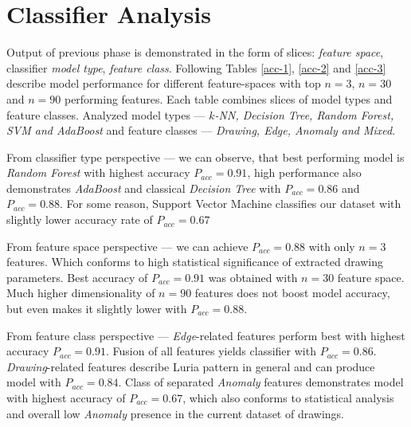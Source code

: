 \section{Classifier Analysis}

Output of previous phase is demonstrated in the form of slices: \textit{feature space}, classifier \textit{model type}, \textit{feature class}. Following Tables \ref{acc-1}, \ref{acc-2} and \ref{acc-3} describe model performance for different feature-spaces with top $n=3$, $n=30$ and $n=90$ performing features. Each table combines slices of model types and feature classes. Analyzed model types --- \textit{$k$-NN, Decision Tree, Random Forest, SVM and AdaBoost} and feature classes --- \textit{Drawing, Edge, Anomaly and Mixed}.

From classifier type perspective --- we can observe, that best performing model is \textit{Random Forest} with highest accuracy $P_{acc} = 0.91$, high performance also demonstrates \textit{AdaBoost} and classical \textit{Decision Tree} with $P_{acc} = 0.86$ and $P_{acc} = 0.88$. For some reason, Support Vector Machine classifies our dataset with slightly lower accuracy rate of $P_{acc} = 0.67$

From feature space perspective --- we can achieve $P_{acc} = 0.88$ with only $n=3$ features. Which conforms to high statistical significance of extracted drawing parameters. Best accuracy of $P_{acc} = 0.91$ was obtained with $n=30$ feature space. Much higher dimensionality of $n = 90$ features does not boost model accuracy, but even makes it slightly lower with $P_{acc} = 0.88$.

From feature class perspective --- \textit{Edge}-related features perform best with highest accuracy $P_{acc} = 0.91$. Fusion of all features yields classifier with $P_{acc} = 0.86$. \textit{Drawing}-related features describe Luria pattern in general and can produce model with $P_{acc} = 0.84$. Class of separated \textit{Anomaly} features demonstrates model with highest accuracy of $P_{acc} = 0.67$, which also conforms to statistical analysis and overall low \textit{Anomaly} presence in the current dataset of drawings.




